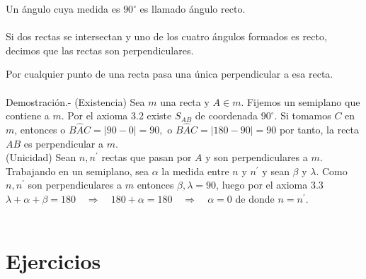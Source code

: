 \begin{tcolorbox}[colframe=white]
    \begin{def.}
	Un ángulo cuya medida es $90^{\circ}$ es llamado ángulo recto.\\\\
	Si dos rectas se intersectan y uno de los cuatro ángulos formados es recto, decimos que las rectas son perpendiculares.
    \end{def.}
\end{tcolorbox}

    \begin{teo}
	Por cualquier punto de una recta pasa una única perpendicular a esa recta.\\\\
	    Demostración.-\; (Existencia) Sea $m$ una recta y $A \in m$. Fijemos un semiplano que contiene a $m$. Por el axioma 3.2 existe $S_{AB}$ de coordenada $90^{\circ}$. Si tomamos $C$ en $m$, entonces o $B\widehat{A}C = |90-0|=90,$ o $B\widehat{A}C=|180-90|=90$ por tanto, la recta $AB$ es perpendicular a $m$.\\
	    (Unicidad) Sean $n,n^{'}$ rectas que pasan por $A$ y son perpendiculares a $m$. Trabajando en un semiplano, sea $\alpha$ la medida entre $n$ y $n^{'}$ y sean $\beta$ y $\lambda$. Como $n,n^{'}$ son perpendiculares a $m$ entonces $\beta, \lambda =90$, luego por el axioma 3.3 $\lambda + \alpha + \beta =180 \quad \Rightarrow \quad 180 + \alpha = 180 \quad \Rightarrow \quad \alpha = 0 $ de donde $n=n^{'}$.\\\\
    \end{teo}

\section{Ejercicios}

